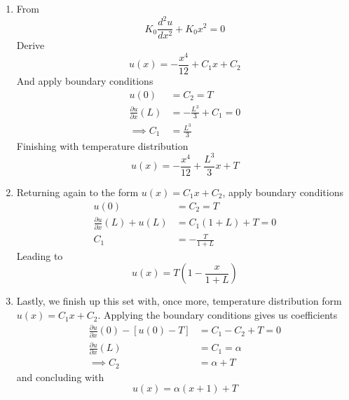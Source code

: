 \documentclass[a4paper]{article}
\begin{document}
\begin{enumerate}[label=(\alph*)]
	\[
		K_{0}\frac{d^{2}u}{dx^{2}} + K_{0} = 0
	\]
	Divide through by \( K_{0} \) and isolate the second derivative to get
	\[
		\frac{d^{2}u}{dx^{2}} = -1
	\]
	Integrating twice yields the quadratic
	\[
		u \!\left( x \right) = -\frac{x^{2}}{2} + C_{1}x + C_{2} 
	\]
	Imposing the boundary conditions, derive
	\begin{align*}
		u \!\left( 0 \right) & = C_{2} = T_{1} \\
		u \!\left( L \right) & = -\frac{L^{2}}{2} + C_{1}L + T_{1} = T_{2} \\ 
		      \implies C_{1} & = \frac{2 \!\left( T_{2} - T_{1} \right) + L^{2}}{2L}
	\end{align*}
	Leaving us with
	\[
		u \!\left( x \right) = -\frac{x^{2}}{2} + \!\left[ \frac{2 \!\left( T_{2} - T_{1} \right) + L^{2}}{2L} \right]x + T_{1} 
	\]
	\item From
	\[
		K_{0}\frac{d^{2}u}{dx^{2}} + K_{0}x^{2} = 0 
	\]
	Derive
	\[
		u \!\left( x \right) = -\frac{x^{4}}{12} + C_{1}x + C_{2} 
	\]
	And apply boundary conditions
	\begin{align*}
		u \!\left( 0 \right) & = C_{2} = T \\
		\frac{\partial u}{\partial x}\!\left( L \right) & = -\frac{L^{3}}{3} + C_{1} = 0 \\
		\implies C_{1} & = \frac{L^{3}}{3}
	\end{align*}
	Finishing with temperature distribution
	\[
		u \!\left( x \right) = -\frac{x^{4}}{12} + \frac{L^{3}}{3}x + T
	\]
	\item Returning again to the form \( u \!\left( x \right) = C_{1}x + C_{2} \), apply boundary conditions
	\begin{align*}
		u \!\left( 0 \right) & = C_{2} = T \\
		\frac{\partial u}{\partial x}\!\left( L \right) + u \!\left( L \right) & = C_{1}\!\left( 1 + L \right) + T = 0 \\ 
		C_{1} & = -\frac{T}{1 + L}
	\end{align*}
	Leading to
	\[
		u \!\left( x \right) = T \!\left( 1 - \frac{x}{1 + L} \right) 
	\]
	\item Lastly, we finish up this set with, once more, temperature distribution form \( u \!\left( x \right) = C_{1}x + C_{2} \). Applying the boundary conditions gives us coefficients
	\begin{align*}
		\frac{\partial u}{\partial x}\!\left( 0 \right) - \!\left[ u \!\left( 0 \right) - T \right] & = C_{1} - C_{2} + T = 0 \\
		\frac{\partial u}{\partial x}\!\left( L \right) & = C_{1} = \alpha \\ 
		\implies C_{2} & = \alpha + T
	\end{align*}
	and concluding with
	\[
		u \!\left( x \right) = \alpha \!\left( x + 1 \right) + T 
	\]
\end{enumerate}
\end{document}
